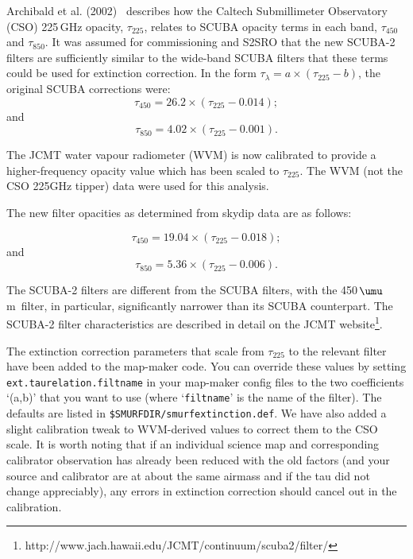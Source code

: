 \documentclass[twoside,11pt]{article}
\newcommand{\micron}{\mbox{\,${\umu}$m}}            %
\newcommand{\htmladdnormallinkfoot}[2]{#1\footnote{#2}}
\renewcommand{\_}{\texttt{\symbol{95}}}
\newcommand{\param}[1]{\texttt{#1}}
\begin{document}
Archibald et al. (2002)~\cite{archibald} describes how the
Caltech Submillimeter Observatory (CSO) 225\,GHz opacity,
$\tau_{225}$, relates to SCUBA opacity terms in each band,
$\tau_{450}$ and $\tau_{850}$. It was assumed for commissioning and
S2SRO that the new SCUBA-2 filters are sufficiently similar to the
wide-band SCUBA filters that these terms could be used for extinction
correction. In the form $\tau_{\lambda} = a \times (\tau_{225} - b)$,
the original SCUBA corrections were:
\begin{equation}
\tau_{450} = 26.2 \times (\tau_{225} - 0.014);
\end{equation}
and
\begin{equation}
\tau_{850} = 4.02 \times (\tau_{225} - 0.001).
\end{equation}

The JCMT water vapour radiometer (WVM) is now calibrated to provide a
higher-frequency opacity value which has been scaled to
$\tau_{225}$. The WVM (not the CSO 225GHz tipper) data were used for
this analysis.

The new filter opacities as determined from skydip data are as
follows:

\begin{equation}
\tau_{450} = 19.04 \times (\tau_{225} - 0.018);
\end{equation}
and
\begin{equation}
\tau_{850} = 5.36 \times (\tau_{225} - 0.006).
\end{equation}

The SCUBA-2 filters are different from the SCUBA filters, with the
450\micron\ filter, in particular, significantly narrower than its
SCUBA counterpart. The SCUBA-2 filter characteristics are described in
detail \htmladdnormallinkfoot{on the JCMT
  website}{http://www.jach.hawaii.edu/JCMT/continuum/scuba2/filter/}.

The extinction correction parameters that scale from $\tau_{225}$ to
the relevant filter have been added to the map-maker code. You can
override these values by setting \param{ext.taurelation.filtname} in
your map-maker config files to the two coefficients `(a,b)' that you
want to use (where `\texttt{filtname}' is the name of the filter). The
defaults are listed in \texttt{\$SMURF\_DIR/smurf\_extinction.def}. We have
also added a slight calibration tweak to WVM-derived values to correct
them to the CSO scale. It is worth noting that if an individual
science map and corresponding calibrator observation has already been
reduced with the old factors (and your source and calibrator are at
about the same airmass and if the tau did not change appreciably), any
errors in extinction correction should cancel out in the calibration.
\end{document}

